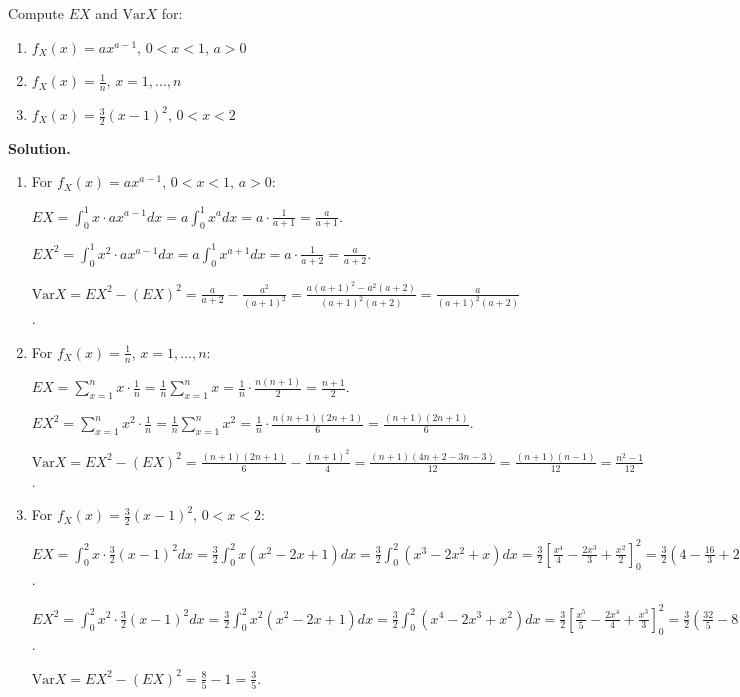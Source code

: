 \begin{problembox}
Compute $EX$ and $\text{Var}X$ for:
\begin{enumerate}[label=(\alph*)]
    \item $f_X(x)=ax^{a-1}$, $0<x<1$, $a>0$
    \item $f_X(x)=\frac{1}{n}$, $x=1,...,n$
    \item $f_X(x)=\frac{3}{2}(x-1)^2$, $0<x<2$
\end{enumerate}
\end{problembox}

\noindent\textbf{Solution.}
\begin{enumerate}[label=(\alph*)]
    \item For $f_X(x)=ax^{a-1}$, $0<x<1$, $a>0$:
    
    $EX = \int_0^1 x \cdot ax^{a-1}dx = a\int_0^1 x^a dx = a \cdot \frac{1}{a+1} = \frac{a}{a+1}$.
    
    $EX^2 = \int_0^1 x^2 \cdot ax^{a-1}dx = a\int_0^1 x^{a+1} dx = a \cdot \frac{1}{a+2} = \frac{a}{a+2}$.
    
    $\text{Var}X = EX^2 - (EX)^2 = \frac{a}{a+2} - \frac{a^2}{(a+1)^2} = \frac{a(a+1)^2 - a^2(a+2)}{(a+1)^2(a+2)} = \frac{a}{(a+1)^2(a+2)}$.
    
    \item For $f_X(x)=\frac{1}{n}$, $x=1,...,n$:
    
    $EX = \sum_{x=1}^n x \cdot \frac{1}{n} = \frac{1}{n} \sum_{x=1}^n x = \frac{1}{n} \cdot \frac{n(n+1)}{2} = \frac{n+1}{2}$.
    
    $EX^2 = \sum_{x=1}^n x^2 \cdot \frac{1}{n} = \frac{1}{n} \sum_{x=1}^n x^2 = \frac{1}{n} \cdot \frac{n(n+1)(2n+1)}{6} = \frac{(n+1)(2n+1)}{6}$.
    
    $\text{Var}X = EX^2 - (EX)^2 = \frac{(n+1)(2n+1)}{6} - \frac{(n+1)^2}{4} = \frac{(n+1)(4n+2-3n-3)}{12} = \frac{(n+1)(n-1)}{12} = \frac{n^2-1}{12}$.
    
    \item For $f_X(x)=\frac{3}{2}(x-1)^2$, $0<x<2$:
    
    $EX = \int_0^2 x \cdot \frac{3}{2}(x-1)^2dx = \frac{3}{2}\int_0^2 x(x^2-2x+1)dx = \frac{3}{2}\int_0^2 (x^3-2x^2+x)dx = \frac{3}{2}\left[\frac{x^4}{4} - \frac{2x^3}{3} + \frac{x^2}{2}\right]_0^2 = \frac{3}{2}\left(4 - \frac{16}{3} + 2\right) = \frac{3}{2} \cdot \frac{2}{3} = 1$.
    
    $EX^2 = \int_0^2 x^2 \cdot \frac{3}{2}(x-1)^2dx = \frac{3}{2}\int_0^2 x^2(x^2-2x+1)dx = \frac{3}{2}\int_0^2 (x^4-2x^3+x^2)dx = \frac{3}{2}\left[\frac{x^5}{5} - \frac{2x^4}{4} + \frac{x^3}{3}\right]_0^2 = \frac{3}{2}\left(\frac{32}{5} - 8 + \frac{8}{3}\right) = \frac{3}{2} \cdot \frac{16}{15} = \frac{8}{5}$.
    
    $\text{Var}X = EX^2 - (EX)^2 = \frac{8}{5} - 1 = \frac{3}{5}$.
\end{enumerate}

